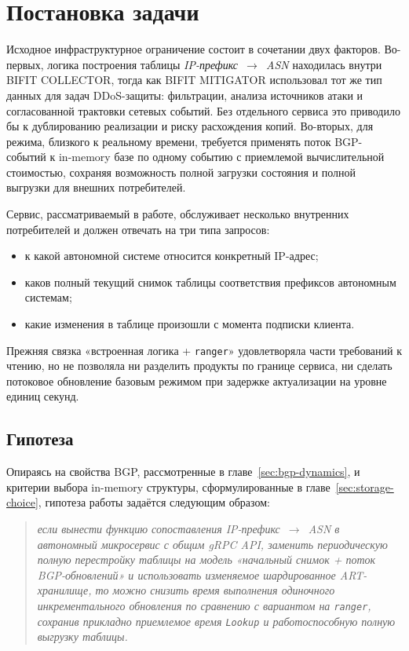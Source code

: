 \section{Постановка задачи}
\label{sec:problem}

Исходное инфраструктурное ограничение состоит в сочетании двух факторов.
Во-первых, логика построения таблицы
\textit{IP-префикс~$\rightarrow$~ASN} находилась внутри BIFIT COLLECTOR,
тогда как BIFIT MITIGATOR использовал тот же тип данных для задач
DDoS-защиты: фильтрации, анализа источников атаки и согласованной
трактовки сетевых событий. Без отдельного сервиса это приводило бы к
дублированию реализации и риску расхождения копий. Во-вторых, для режима,
близкого к реальному времени, требуется применять поток BGP-событий к
in-memory базе по одному событию с приемлемой вычислительной стоимостью,
сохраняя возможность полной загрузки состояния и полной выгрузки для
внешних потребителей.

Сервис, рассматриваемый в работе, обслуживает несколько внутренних
потребителей и должен отвечать на три типа запросов:

\begin{itemize}
\item к какой автономной системе относится конкретный IP-адрес;
\item каков полный текущий снимок таблицы соответствия префиксов
автономным системам;
\item какие изменения в таблице произошли с момента подписки клиента.
\end{itemize}

Прежняя связка «встроенная логика + \texttt{ranger}» удовлетворяла части
требований к чтению, но не позволяла ни разделить продукты по границе
сервиса, ни сделать потоковое обновление базовым режимом при задержке
актуализации на уровне единиц секунд.

\subsection{Гипотеза}

Опираясь на свойства BGP, рассмотренные в главе~\ref{sec:bgp-dynamics},
и критерии выбора in-memory структуры, сформулированные в
главе~\ref{sec:storage-choice}, гипотеза работы задаётся следующим
образом:

\begin{quote}
\textit{если вынести функцию сопоставления
\textit{IP-префикс~$\rightarrow$~ASN} в автономный микросервис с общим
gRPC API, заменить периодическую полную перестройку таблицы на модель
«начальный снимок + поток BGP-обновлений» и использовать изменяемое
шардированное ART-хранилище, то можно снизить время выполнения
одиночного инкрементального обновления по сравнению с вариантом на
\texttt{ranger}, сохранив прикладно приемлемое время \texttt{Lookup} и
работоспособную полную выгрузку таблицы.}
\end{quote}

